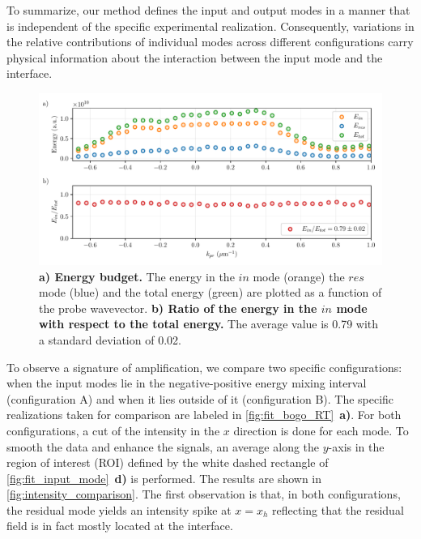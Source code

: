 To summarize, our method defines the input and output modes in a manner that is independent of the specific experimental realization. Consequently, variations in the relative contributions of individual modes across different configurations carry physical information about the interaction between the input mode and the interface. 
 \begin{figure}
    \centering
    \includegraphics[width=1\textwidth]{chap_stimulated_hawking/fig/energy_budget.pdf}
    \caption{\textbf{a) Energy budget.} The energy in the $in$ mode (orange) the $res$ mode (blue) and the total energy (green) are plotted as a function of the probe wavevector. 
    \textbf{b) Ratio of the energy in the $in$ mode with respect to the total energy.} The average value is 0.79 with a standard deviation of 0.02.}
    \label{fig:energy_budget}
 \end{figure}

\bigskip

To observe a signature of amplification, we compare two specific configurations: when the input modes lie in the negative-positive energy mixing interval (configuration A) and when it lies outside of it (configuration B). The specific 
realizations taken for comparison are labeled in \autoref{fig:fit_bogo_RT}~\textbf{a)}. For both configurations, a cut of the intensity in the $x$ direction is done for each mode. To smooth the data and enhance the signals, an average along the $y$-axis in the region of interest (ROI) defined by the white dashed rectangle of \autoref{fig:fit_input_mode}~\textbf{d)} is performed. 
The results are shown in \autoref{fig:intensity_comparison}. The first observation is that, in both configurations, the residual mode yields an intensity spike at $x=x_h$ reflecting that the residual field is in fact mostly located at the interface. 

